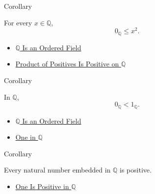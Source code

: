 \begin{corollarybox}{Corollary}
\begin{corollary}
\label{cor:squares-nonnegative-on-q}
For every $x\in\mathbb{Q}$,
\[
0_{\mathbb{Q}}\le x^2.
\]
\end{corollary}
\end{corollarybox}

\begin{dependencies}
\begin{itemize}
  \item \hyperref[thm:q-is-an-ordered-field]{$\mathbb{Q}$ Is an Ordered Field}
  \item \hyperref[prop:product-of-positives-is-positive-q]{Product of Positives Is Positive on $\mathbb{Q}$}
\end{itemize}
\end{dependencies}

\begin{corollarybox}{Corollary}
\begin{corollary}
\label{cor:one-positive-on-q}
In $\mathbb{Q}$,
\[
0_{\mathbb{Q}}<1_{\mathbb{Q}}.
\]
\end{corollary}
\end{corollarybox}

\begin{dependencies}
\begin{itemize}
  \item \hyperref[thm:q-is-an-ordered-field]{$\mathbb{Q}$ Is an Ordered Field}
  \item \hyperref[def:one-in-q]{One in $\mathbb{Q}$}
\end{itemize}
\end{dependencies}

\begin{corollarybox}{Corollary}
\begin{corollary}
\label{cor:natural-numbers-positive-on-q}
Every natural number embedded in $\mathbb{Q}$ is positive.
\end{corollary}
\end{corollarybox}

\begin{dependencies}
\begin{itemize}
  \item \hyperref[cor:one-positive-on-q]{One Is Positive in $\mathbb{Q}$}
\end{itemize}
\end{dependencies}


